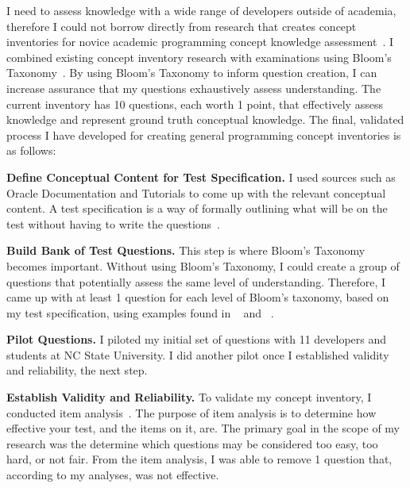 \documentclass{llncs}
\begin{document}
I need to assess knowledge with a wide range of developers outside of academia, therefore I could not borrow directly from research that creates concept inventories for novice academic programming concept knowledge assessment~\cite{tew2010assessing}. I combined existing concept inventory research with examinations using Bloom's Taxonomy~\cite{tew2010developing,nelson1967testing,scott2003bloom}. By using Bloom's Taxonomy to inform question creation, I can increase assurance that my questions exhaustively assess understanding. The current inventory has 10 questions, each worth 1 point, that effectively assess knowledge and represent ground truth conceptual knowledge. The final, validated process I have developed for creating general programming concept inventories is as follows:

\vspace{0.5em}
\noindent\textbf{Define Conceptual Content for Test Specification.} I used sources such as Oracle Documentation and Tutorials to come up with the relevant conceptual content. A test specification is a way of formally outlining what will be on the test without having to write the questions~\cite{tew2010developing}. 

\vspace{0.5em}

\noindent\textbf{Build Bank of Test Questions.} This step is where Bloom's Taxonomy becomes important. Without using Bloom's Taxonomy, I could create a group of questions that potentially assess the same level of understanding. Therefore, I came up with at least 1 question for each level of Bloom's taxonomy, based on my test specification, using examples found in ~\cite{nelson1967testing} and ~\cite{thompson2008bloom}.  

\vspace*{0.5em}

\noindent\textbf{Pilot Questions.} I piloted my initial set of questions with 11 developers and students at NC State University. I did another pilot once I established validity and reliability, the next step.

\vspace*{0.5em}

\noindent \textbf{Establish Validity and Reliability.} To validate my concept inventory, I conducted item analysis~\cite{gorsuch1997exploratory}. The purpose of item analysis is to determine how effective your test, and the items on it, are. The primary goal in the scope of my research was the determine which questions may be considered too easy, too hard, or not fair. From the item analysis, I was able to remove 1 question that, according to my analyses, was not effective.
\end{document}

